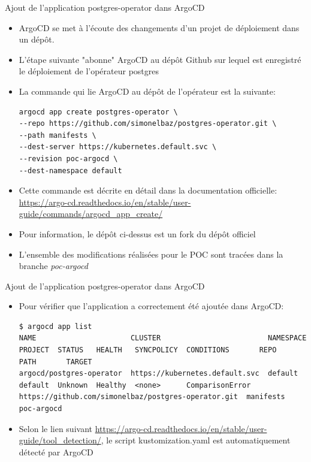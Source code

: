 
\begin{frame}[fragile]{Ajout de l'application postgres-operator dans ArgoCD}

\begin{itemize}
   \item ArgoCD se met à l'écoute des changements d'un projet de déploiement dans un dépôt.
   \item L'étape suivante "abonne" ArgoCD au dépôt Github sur lequel est enregistré le déploiement de l'opérateur postgres
   \item La commande qui lie ArgoCD au dépôt de l'opérateur est la suivante:
\begin{tiny}
\begin{Verbatim}[commandchars=\&\#\#]
argocd app create postgres-operator \
--repo https://github.com/simonelbaz/postgres-operator.git \
--path manifests \
--dest-server https://kubernetes.default.svc \
--revision poc-argocd \
--dest-namespace default
\end{Verbatim}
\end{tiny}
   \item Cette commande est décrite en détail dans la documentation  officielle: \url{https://argo-cd.readthedocs.io/en/stable/user-guide/commands/argocd_app_create/}
   \item Pour information, le dépôt ci-dessus est un fork du dépôt officiel
   \item L'ensemble des modifications réalisées pour le POC sont tracées dans la branche \textit{poc-argocd}
\end{itemize}

\end{frame}


\begin{frame}[fragile]{Ajout de l'application postgres-operator dans ArgoCD}

\begin{itemize}
   \item Pour vérifier que l'application a correctement été ajoutée dans ArgoCD:
\begin{tiny}
\begin{Verbatim}[commandchars=\&\#\#]
$ argocd app list
NAME                      CLUSTER                         NAMESPACE  PROJECT  STATUS   HEALTH   SYNCPOLICY  CONDITIONS       REPO                                                 PATH       TARGET
argocd/postgres-operator  https://kubernetes.default.svc  default    default  Unknown  Healthy  <none>      ComparisonError  https://github.com/simonelbaz/postgres-operator.git  manifests  poc-argocd
\end{Verbatim}
\end{tiny}
   \item Selon le lien suivant \url{https://argo-cd.readthedocs.io/en/stable/user-guide/tool_detection/}, le script kustomization.yaml est automatiquement détecté par ArgoCD
\end{itemize}

\end{frame}

